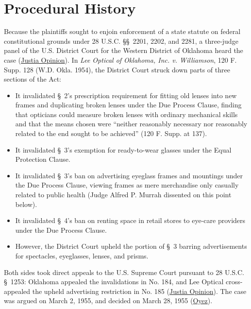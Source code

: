\documentclass[12pt]{article}
\begin{document}
\section{Procedural History}
Because the plaintiffs sought to enjoin enforcement of a state statute on federal constitutional grounds under 28 U.S.C. \S\S~2201, 2202, and 2281, a three-judge panel of the U.S. District Court for the Western District of Oklahoma heard the case (\href{https://supreme.justia.com/cases/federal/us/348/483/}{Justia Opinion}). In \textit{Lee Optical of Oklahoma, Inc. v. Williamson}, 120 F. Supp. 128 (W.D. Okla. 1954), the District Court struck down parts of three sections of the Act:
\begin{itemize}
    \item It invalidated \S~2's prescription requirement for fitting old lenses into new frames and duplicating broken lenses under the Due Process Clause, finding that opticians could measure broken lenses with ordinary mechanical skills and that the means chosen were ``neither reasonably necessary nor reasonably related to the end sought to be achieved'' (120 F. Supp. at 137).
    \item It invalidated \S~3's exemption for ready-to-wear glasses under the Equal Protection Clause.
    \item It invalidated \S~3's ban on advertising eyeglass frames and mountings under the Due Process Clause, viewing frames as mere merchandise only casually related to public health (Judge Alfred P. Murrah dissented on this point below).
    \item It invalidated \S~4's ban on renting space in retail stores to eye-care providers under the Due Process Clause.
    \item However, the District Court upheld the portion of \S~3 barring advertisements for spectacles, eyeglasses, lenses, and prisms.
\end{itemize}

Both sides took direct appeals to the U.S. Supreme Court pursuant to 28 U.S.C. \S~1253: Oklahoma appealed the invalidations in No. 184, and Lee Optical cross-appealed the upheld advertising restriction in No. 185 (\href{https://supreme.justia.com/cases/federal/us/348/483/}{Justia Opinion}). The case was argued on March 2, 1955, and decided on March 28, 1955 (\href{https://www.oyez.org/cases/1940-1955/348us483}{Oyez}).
\end{document}
